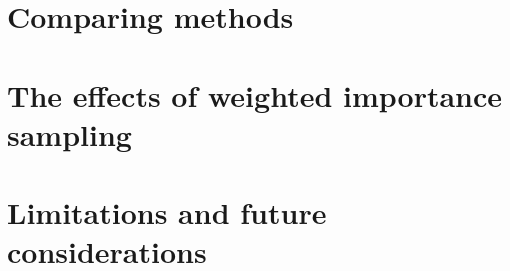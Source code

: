 \documentclass{article}
\begin{document}
\section{Comparing methods}
\section{The effects of weighted importance sampling}
\section{Limitations and future considerations}
\end{document}
